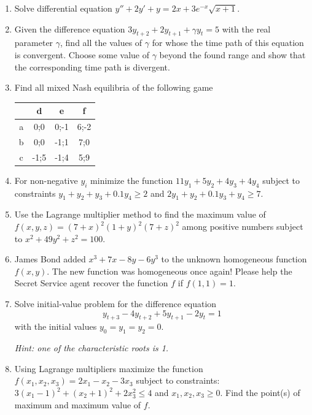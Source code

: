 \documentclass[12pt]{article} %
\theoremstyle{definition} %
\begin{document}
\begin{enumerate}

\item Solve differential equation $y''+2y'+y=2x+3e^{-x} \sqrt{x+1} $.

\item Given the difference equation $3y_{t+2} +2y_{t+1} +\gamma y_{t} =5$ with the real parameter $\gamma $, find all the values of  $\gamma$ for whose the time path of this equation is convergent.
Choose some value of $\gamma$ beyond the found range and show that the corresponding time path is divergent.


\item Find all mixed Nash equilibria of the following game

\begin{tabular}{c|ccc}
  & d & e & f \\
\midrule
a & 0;0  & 0;-1 & 6;-2 \\
b & 0;0  & -1;1 & 7;0 \\
c & -1;5 & -1;4 & 5;9
\end{tabular}

\item For non-negative $y_i$ minimize the function $11y_1 + 5 y_2 + 4y_3 +4y_4$ subject to constraints $y_1 + y_2 + y_3 +0.1y_4 \geq 2$ and $2y_1+y_2+0.1y_3+y_4 \geq 7$.


\item Use the Lagrange multiplier method to find the maximum value of $f(x,y,z)=(7+x)^2(1+y)^2(7+z)^2$ among positive numbers subject to $x^2 + 49y^2 + z^2 = 100$.

\item James Bond added $x^3+7x-8y - 6y^3$ to the unknown homogeneous function $f(x, y)$. The new function was homogeneous once again! Please help the Secret Service agent recover the function $f$ if $f(1, 1)=1$.


\item Solve initial-value problem for the difference equation
\[
y_{t+3} -4y_{t+2} +5y_{t+1} -2y_{t} =1
\]
with the initial values $y_{0} =y_{1} =y_{2} =0$.

\textit{Hint: one of the characteristic roots is 1.}

\item Using Lagrange multipliers maximize the function $f(x_1,x_2,x_3)=2x_1-x_2-3x_3$ subject to constraints:   $3(x_1-1)^2+(x_2+1)^2+2x_3^2\leq 4$ and $x_1, x_2, x_3 \geq 0$. Find the point(s) of maximum and maximum value of $f$.

\end{enumerate}
\end{document}
